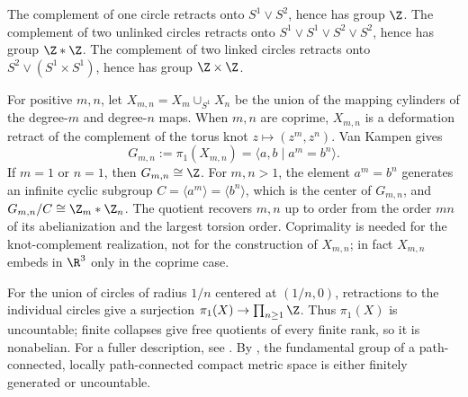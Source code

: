 \begin{example}
\label{ex:linking-of-circles-fundamental-groups}

The complement of one circle retracts onto $S^1\vee S^2$, hence has group
$\Z$. The complement of two unlinked circles retracts onto
$S^1\vee S^1\vee S^2\vee S^2$, hence has group $\Z*\Z$. The complement of
two linked circles retracts onto $S^2\vee(S^1\times S^1)$, hence has group
$\Z\times\Z$.
\end{example}

\begin{example}
\label{ex:torus-knot-complement-fundamental-group}

For positive $m,n$, let $X_{m,n}=X_m\cup_{S^1}X_n$ be the union of the mapping
cylinders of the degree-$m$ and degree-$n$ maps. When $m,n$ are coprime,
$X_{m,n}$ is a deformation retract of the complement of the torus knot
$z\mapsto(z^m,z^n)$. Van Kampen gives
\[
G_{m,n}:=\pi_1(X_{m,n})=\langle a,b\mid a^m=b^n\rangle.
\]
If $m=1$ or $n=1$, then $G_{m,n}\cong\Z$. For $m,n>1$, the element
$a^m=b^n$ generates an infinite cyclic subgroup
$C=\langle a^m\rangle=\langle b^n\rangle$, which is the center of $G_{m,n}$,
and $G_{m,n}/C\cong\Z_m*\Z_n$. The quotient recovers $m,n$ up to order from
the order $mn$ of its abelianization and the largest torsion order. Coprimality
is needed for the knot-complement realization, not for the construction of
$X_{m,n}$; in fact $X_{m,n}$ embeds in $\R^3$ only in the coprime case.
\end{example}

\begin{example}
\label{ex:shrinking-wedge-circles}

For the union of circles of radius $1/n$ centered at $(1/n,0)$, retractions
to the individual circles give a surjection
$\pi_1(X)\to\prod_{n\geq1}\Z$. Thus $\pi_1(X)$ is uncountable; finite
collapses give free quotients of every finite rank, so it is nonabelian.
For a fuller description, see \cite{CannonConner2000}. By \cite{Shelah1988},
the fundamental group of a path-connected, locally path-connected compact
metric space is either finitely generated or uncountable.
\end{example}

